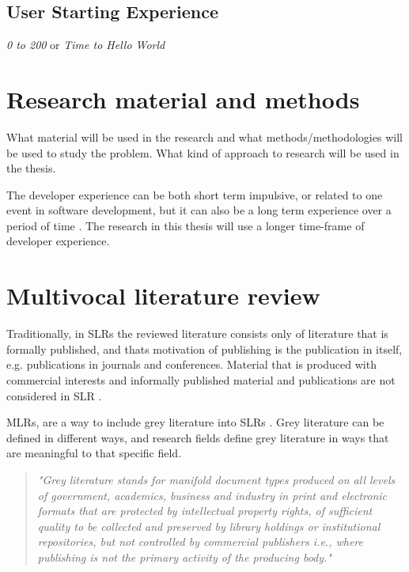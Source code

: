 \documentclass[english, 12pt, a4paper, sci, utf8, a-1b, online]{aaltothesis}
\begin{document}
\subsection{User Starting Experience}

\textit{0 to 200} or \textit{Time to Hello World}

\clearpage
\section{Research material and methods}

What material will be used in the research and what methods/methodologies will be used to study the problem. What kind of approach to research will be used in the thesis.

The developer experience can be both short term impulsive, or related to one event in software development, but it can also be a long term experience over a period of time \cite{fagerholm-doctoral-thesis}. The research in this thesis will use a longer time-frame of developer experience.

\clearpage
\section{Multivocal literature review}

Traditionally, in SLRs the reviewed literature consists only of literature that is formally published, and thats motivation of publishing is the publication in itself, e.g. publications in journals and conferences. Material that is produced with commercial interests and informally published material and publications are not considered in SLR \cite{guidelines-for-MLR}.

MLRs, are a way to include grey literature into SLRs \cite{the-need-for-MLR}. Grey literature can be defined in different ways, and research fields define grey literature in ways that are meaningful to that specific field.

\begin{quotation}
  \textit{"Grey literature stands for manifold document types produced on all levels of government, academics, business and industry in print and electronic formats that are protected by intellectual property rights, of sufficient quality to be collected and preserved by library holdings or institutional repositories, but not controlled by commercial publishers i.e., where publishing is not the primary activity of the producing body."} \cite{towards-a-prague-definition-of-grey-literature}
\end{quotation}
\end{document}
